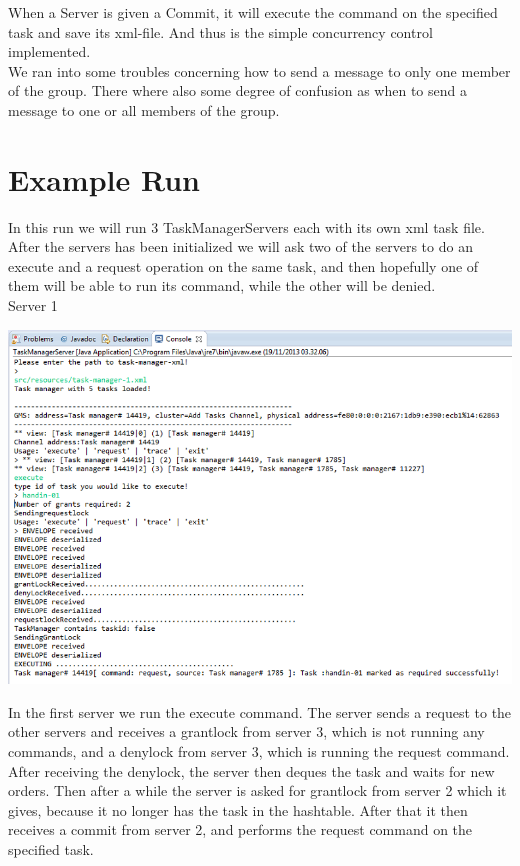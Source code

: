 When a Server is given a Commit, it will execute the command on the specified task and save its xml-file. And thus is the simple concurrency control implemented. \\

We ran into some troubles concerning how to send a message to only one member of the group. There where also some degree of confusion as when to send a message to one or all members of the group. \\


\section{Example Run}
\label{MutualExclusion_run}

In this run we will run 3 TaskManagerServers each with its own xml task file. After the servers has been initialized we will ask two of the servers to do an execute and a request operation on the same task, and then hopefully one of them will be able to run its command, while the other will be denied. \\

\caption{Server 1}
\includegraphics[scale=0.6]{images/CCServer1.png}

In the first server we run the execute command. The server sends a request to the other servers and receives a grantlock from server 3, which is not running any commands, and a denylock from server 3, which is running the request command. After receiving the denylock, the server then deques the task and waits for new orders. Then after a while the server is asked for grantlock from server 2 which it gives, because it no longer has the task in the hashtable. After that it then receives a commit from server 2, and performs the request command on the specified task. \\


